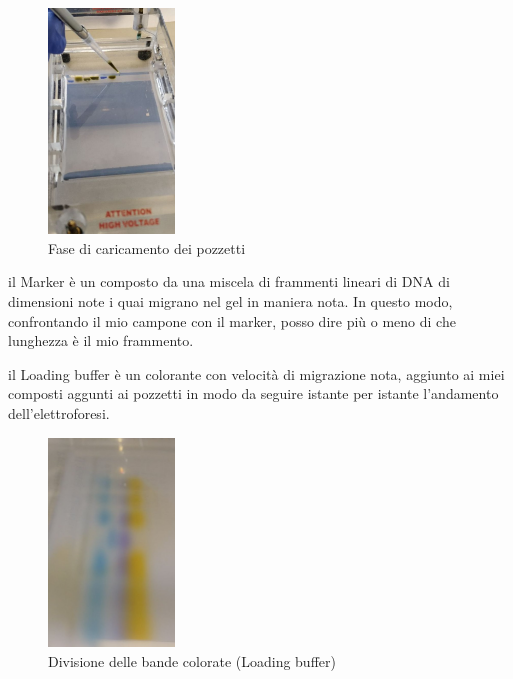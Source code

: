 \begin{enumerate}
	\begin{figure}[H]
	
		\centering
		\includegraphics[width=0.3\textwidth]{./immagini/caricamento.jpg}
		\caption{Fase di caricamento dei pozzetti}
		\label{cricamento}
	
	\end{figure}
	
	il Marker è un composto da una miscela di frammenti lineari di DNA di dimensioni note i quai migrano nel gel in maniera nota. In questo modo, confrontando il mio campone con il marker, posso dire più o meno di che lunghezza è il mio frammento. 
	
	il Loading buffer è un colorante con velocità di migrazione nota, aggiunto ai miei composti aggunti ai pozzetti in modo da seguire istante per istante l'andamento dell'elettroforesi. 
	
	\begin{figure}[H]
		
		\centering
		\includegraphics[width=0.3\textwidth]{./immagini/separazione.jpg}
		\caption{Divisione delle bande colorate (Loading buffer)}
		\label{loading_bufer}
	
	\end{figure}
	

\end{enumerate}
